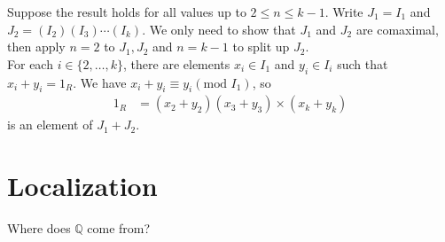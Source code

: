 \documentclass[8pt]{extarticle}
\newcommand{\Q}{\mathbb{Q}}
\begin{document}
  Suppose the result holds for all values up to $2\leq n \leq k-1$. Write $J_1 = I_1$ and $J_2 = (I_2)(I_3)\cdots(I_k)$. We only need to show that $J_1$ and $J_2$ are comaximal, then apply $n=2$ to $J_1,J_2$ and $n=k-1$ to split up $J_2$.\\

  For each $i\in \{2,\dots,k\}$, there are elements $x_i\in I_1$ and $y_i\in I_{i}$ such that $x_i + y_i = 1_R$. We have $x_i + y_i \equiv y_i (\text{mod } I_1)$, so
  \begin{align*}
   1_R &= (x_2 + y_2)(x_3 + y_3)\times(x_k + y_k)
  \end{align*}
  is an element of $J_1 + J_2$.
  \section{Localization}%
  Where does $\Q$ come from?\\
\end{document}
